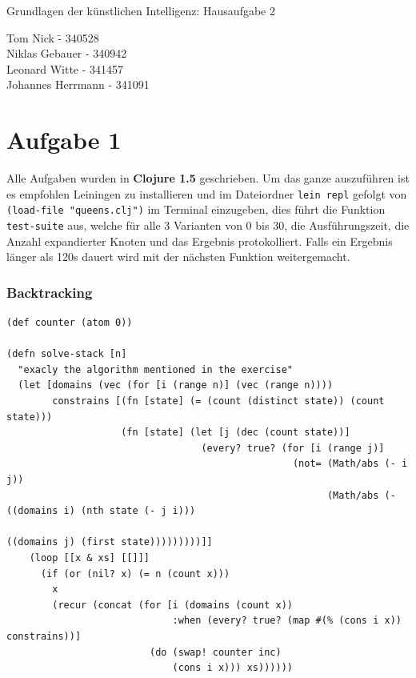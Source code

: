 \documentclass[a4paper,10pt]{article}
\begin{document}
\begin{center}
\Large{Grundlagen der künstlichen Intelligenz: Hausaufgabe 2} \\
\end{center}
\begin{tabbing}
Tom Nick \hspace{2cm}\= - 340528\\
Niklas Gebauer \> - 340942 \\
Leonard Witte \> - 341457 \\
Johannes Herrmann \> - 341091\\
\end{tabbing}

\section*{Aufgabe 1}

Alle Aufgaben wurden in \textbf{Clojure 1.5} geschrieben. Um das ganze auszuführen ist es empfohlen Leiningen zu installieren und im Dateiordner \texttt{lein repl} gefolgt von \texttt{(load-file "queens.clj")} im Terminal einzugeben, dies führt die Funktion \texttt{test-suite} aus, welche für alle 3 Varianten von 0 bis 30, die Ausführungszeit, die Anzahl expandierter Knoten und das Ergebnis protokolliert. Falls ein Ergebnis länger als 120s dauert wird mit der nächsten Funktion weitergemacht.
\subsubsection*{Backtracking}
\begin{lstlisting}
(def counter (atom 0))

(defn solve-stack [n]
  "exacly the algorithm mentioned in the exercise"
  (let [domains (vec (for [i (range n)] (vec (range n))))
        constrains [(fn [state] (= (count (distinct state)) (count state)))
                    (fn [state] (let [j (dec (count state))]
                                  (every? true? (for [i (range j)]
                                                  (not= (Math/abs (- i j))
                                                        (Math/abs (- ((domains i) (nth state (- j i)))
                                                                     ((domains j) (first state)))))))))]]
    (loop [[x & xs] [[]]]
      (if (or (nil? x) (= n (count x)))
        x
        (recur (concat (for [i (domains (count x))
                             :when (every? true? (map #(% (cons i x)) constrains))]
                         (do (swap! counter inc)
                             (cons i x))) xs))))))
\end{lstlisting}
\end{document}
